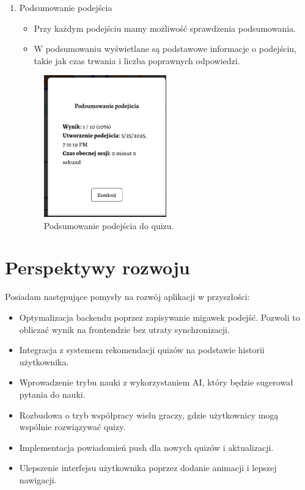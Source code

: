 \documentclass{article}
\begin{document}
\begin{enumerate}
		\item Podsumowanie podejścia \\
        \begin{minipage}{0.4\textwidth}
          \begin{itemize}
            \item Przy każdym podejściu mamy możliwość sprawdzenia podsumowania.
            \item W podsumowaniu wyświetlane są podstawowe informacje o podejściu, takie jak czas trwania i liczba poprawnych odpowiedzi.
          \end{itemize}
        \end{minipage}
        \begin{minipage}{0.6\textwidth}
          \begin{figure}[H]
            \centering
            \includegraphics[width=0.5\textwidth]{../_assets/web/summary.png}
            \caption{Podsumowanie podejścia do quizu.}
            \label{fig:summary}
          \end{figure}
        \end{minipage}

      \end{enumerate}

    \section{Perspektywy rozwoju}
      Posiadam następujące pomysły na rozwój aplikacji w przyszłości:
      \begin{itemize}
        \item Optymalizacja backendu poprzez zapisywanie migawek podejść. Pozwoli to obliczać wynik na frontendzie bez utraty synchronizacji.
        \item Integracja z systemem rekomendacji quizów na podstawie historii użytkownika.
        \item Wprowadzenie trybu nauki z wykorzystaniem AI, który będzie sugerował pytania do nauki.
        \item Rozbudowa o tryb współpracy wielu graczy, gdzie użytkownicy mogą wspólnie rozwiązywać quizy.
        \item Implementacja powiadomień push dla nowych quizów i aktualizacji.
        \item Ulepszenie interfejsu użytkownika poprzez dodanie animacji i lepszej nawigacji.
      \end{itemize}
\end{document}
